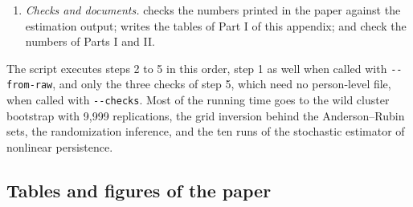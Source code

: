 \begin{enumerate}
 describes the sample and
supplies the first stages on all children;  splits the premium inside the balanced comparison;  runs the census check; then the other scripts of
, among them , , and the five scripts from  to  (occupation by family background, the return without each province, the first stage in percentage points, and the comparisons of earnings and occupation by degree); last, the figure scripts, , and , which writes the tables of the paper.
\item \emph{Checks and documents.}
 checks the numbers printed in the paper against the estimation output;
 writes the tables of Part I
of this appendix; 
and  check the numbers of Parts I and II.
\end{enumerate}

\noindent The script  executes steps 2 to 5 in this order, step 1 as well when called with \texttt{-{}-from-raw}, and only the three checks of step 5, which need no person-level file, when called with \texttt{-{}-checks}. Most of the running time goes to the wild cluster bootstrap with 9,999 replications, the grid inversion behind the Anderson--Rubin sets, the randomization inference, and the ten runs of the stochastic estimator of nonlinear persistence.

\subsection{Tables and figures of the paper}

